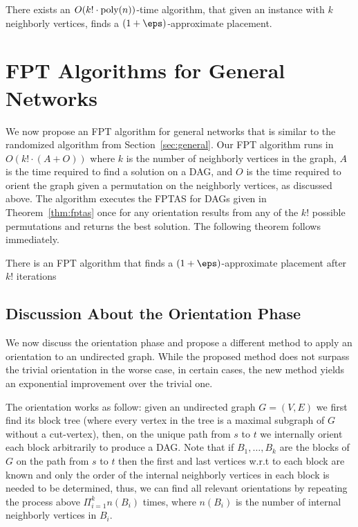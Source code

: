 \begin{theorem}
There exists an $O(k! \cdot \text{\rm poly}(n))$-time algorithm, that
given an \scp instance with $k$ neighborly vertices, finds a
$(1+\eps)$-approximate placement.
\end{theorem}



\section{FPT Algorithms for General Networks}
We now propose an FPT algorithm for general networks that is similar to the randomized 
algorithm from Section~\ref{sec:general}.
Our FPT algorithm runs in $O(k! \cdot (A + O))$ where $k$ is the number of neighborly
vertices in the graph, $A$ is the time required to find a solution on a DAG,
and $O$ is the time required to orient the graph given a permutation on the neighborly
vertices, as discussed above.
The algorithm executes the FPTAS for DAGs given in Theorem~\ref{thm:fptas}
once for any orientation results from any of the $k!$ possible permutations and
returns the best solution.
The following theorem follows immediately.

\begin{theorem}
There is an FPT algorithm that finds a $(1+\eps)$-approximate placement after $k!$ iterations 
\end{theorem} 

\subsection*{Discussion About the Orientation Phase}
We now discuss the orientation phase and propose a different method to apply 
an orientation to an undirected graph.
While the proposed method does not surpass the trivial orientation in the worse case, 
in certain cases, the new method yields an exponential improvement over the trivial one.

The orientation works as follow:
given an undirected graph $G = (V, E)$ we first find its block tree 
(where every vertex in the tree is a maximal subgraph of $G$ without a cut-vertex),
then, on the unique  path from $s$ to $t$ we internally orient each block arbitrarily to
produce a DAG.
Note that if $B_1, \ldots, B_k$ are the blocks of $G$ on the path from $s$ to $t$ then
the first and last vertices w.r.t to each block are known and only the order
of the internal neighborly vertices in each block is needed to be determined,
thus, we can find all relevant orientations by repeating the process above
$\Pi_{i = 1}^k n(B_i)$ times, where $n(B_i)$ is the number of internal neighborly vertices
in $B_i$.

